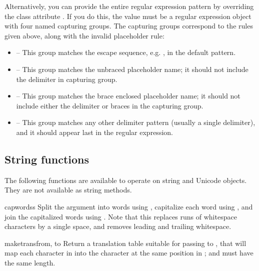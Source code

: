 Alternatively, you can provide the entire regular expression pattern by
overriding the class attribute .  If you do this, the value must
be a regular expression object with four named capturing groups.  The
capturing groups correspond to the rules given above, along with the invalid
placeholder rule:

\begin{itemize}
\item {} -- This group matches the escape sequence,
      e.g. \samp{\$\$}, in the default pattern.
\item {} -- This group matches the unbraced placeholder name; it
      should not include the delimiter in capturing group.
\item {} -- This group matches the brace enclosed placeholder name;
      it should not include either the delimiter or braces in the capturing
      group.
\item {} -- This group matches any other delimiter pattern (usually
      a single delimiter), and it should appear last in the regular
      expression.
\end{itemize}

\subsection{String functions}

The following functions are available to operate on string and Unicode
objects.  They are not available as string methods.

\begin{funcdesc}{capwords}{s}
  Split the argument into words using , capitalize
  each word using , and join the capitalized
  words using .  Note that this replaces runs of
  whitespace characters by a single space, and removes leading and
  trailing whitespace.
\end{funcdesc}

\begin{funcdesc}{maketrans}{from, to}
  Return a translation table suitable for passing to
  , that will map
  each character in  into the character at the same position
  in ;  and  must have the same length.

\end{funcdesc}

